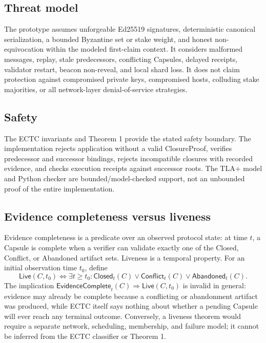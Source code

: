 \documentclass{ledger}
\begin{document}
\subsection{Threat model}
The prototype assumes unforgeable Ed25519 signatures, deterministic canonical serialization, a bounded Byzantine set or stake weight, and honest non-equivocation within the modeled first-claim context. It considers malformed messages, replay, stale predecessors, conflicting Capsules, delayed receipts, validator restart, beacon non-reveal, and local shard loss. It does not claim protection against compromised private keys, compromised hosts, colluding stake majorities, or all network-layer denial-of-service strategies.

\subsection{Safety}
The ECTC invariants and Theorem 1 provide the stated safety boundary. The implementation rejects application without a valid ClosureProof, verifies predecessor and successor bindings, rejects incompatible closures with recorded evidence, and checks execution receipts against successor roots. The TLA+ model and Python checker are bounded/model-checked support, not an unbounded proof of the entire implementation.

\subsection{Evidence completeness versus liveness}
Evidence completeness is a predicate over an observed protocol state: at time $t$, a Capsule is complete when a verifier can validate exactly one of the Closed, Conflict, or Abandoned artifact sets. Liveness is a temporal property. For an initial observation time $t_0$, define
\begin{equation}
\mathsf{Live}(C,t_0)\Longleftrightarrow\exists t\geq t_0:\mathsf{Closed}_t(C)\lor\mathsf{Conflict}_t(C)\lor\mathsf{Abandoned}_t(C).
\end{equation}
The implication $\mathsf{EvidenceComplete}_t(C)\Rightarrow\mathsf{Live}(C,t_0)$ is invalid in general: evidence may already be complete because a conflicting or abandonment artifact was produced, while ECTC itself says nothing about whether a pending Capsule will ever reach any terminal outcome. Conversely, a liveness theorem would require a separate network, scheduling, membership, and failure model; it cannot be inferred from the ECTC classifier or Theorem 1.
\end{document}
